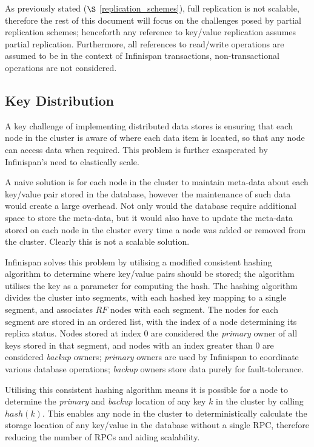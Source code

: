 As previously stated ($\S$ \ref{replication_schemes}), full replication is not scalable, therefore the rest of this document will focus on the challenges posed by partial replication schemes; henceforth any reference to key/value replication assumes partial replication.  Furthermore, all references to read/write operations are assumed to be in the context of Infinispan transactions, non-transactional operations are not considered.  

    \subsection{Key Distribution}
    A key challenge of implementing distributed data stores is ensuring that each node in the cluster is aware of where each data item is located, so that any node can access data when required.  This problem is further exasperated by Infinispan's need to elastically scale.  
    
    A naive solution is for each node in the cluster to maintain meta-data about each key/value pair stored in the database, however the maintenance of such data would create a large overhead.  Not only would the database require additional space to store the meta-data, but it would also have to update the meta-data stored on each node in the cluster every time a node was added or removed from the cluster.  Clearly this is not a scalable solution.  
    
    Infinispan solves this problem by utilising a modified consistent hashing algorithm\citep{Karger:1997:CHR:258533.258660, Infinispan, Ruivo:2011:ETO:2120967.2121604} to determine where key/value pairs should be stored; the algorithm utilises the key as a parameter for computing the hash.  The hashing algorithm divides the cluster into segments, with each hashed key mapping to a single segment, and associates $RF$ nodes with each segment. The nodes for each segment are stored in an ordered list, with the index of a node determining its replica status.  Nodes stored at index 0 are considered the \emph{primary} owner of all keys stored in that segment, and nodes with an index greater than 0 are considered \emph{backup} owners; \emph{primary} owners are used by Infinispan to coordinate various database operations; \emph{backup} owners store data purely for fault-tolerance.  
 
    Utilising this consistent hashing algorithm means it is possible for a node to determine the \emph{primary} and \emph{backup} location of any key $k$ in the cluster by calling $hash(k)$. This enables any node in the cluster to deterministically calculate the storage location of any key/value in the database without a single RPC, therefore reducing the number of RPCs and aiding scalability.  
    
